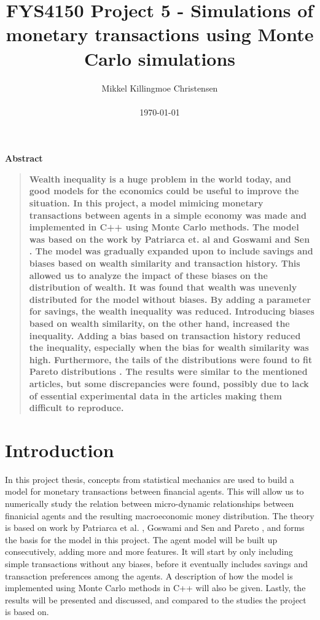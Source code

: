 \documentclass[11pt,a4paper,titlepage]{article}
\title{FYS4150 Project 5 - Simulations of monetary transactions using Monte Carlo simulations}
\author
{Mikkel Killingmoe Christensen\\
\\
\normalsize{\today}
}
\date{}
\newenvironment{sciabstract}{%
\begin{quote} \bf}
{\end{quote}}
\begin{document}
 


\maketitle 


\tableofcontents
\clearpage


\begin{center}
{\large \textbf{Abstract}}
\end{center}
\begin{sciabstract}
Wealth inequality is a huge problem in the world today, and good models  for the economics could be useful to improve the situation. In this project, a model mimicing monetary transactions between agents in a simple economy was made and implemented in C++ using Monte Carlo methods. The model was based on the work by Patriarca et. al \cite{Patriarca} and Goswami and Sen \cite{Goswami}. The model was gradually expanded upon to include savings and biases based on wealth similarity and transaction history. This allowed us to analyze the impact of these biases on the distribution of wealth. It was found that wealth was unevenly distributed for the model without biases. By adding a parameter for savings, the wealth inequality was reduced. Introducing biases based on wealth similarity, on the other hand, increased the inequality.  Adding a bias based on transaction history reduced the inequality, especially when the bias for wealth similarity was high. Furthermore, the tails of the distributions were found to fit Pareto distributions \cite{Pareto}. The results were similar to the mentioned articles, but some discrepancies were found, possibly due to lack of essential experimental data in the articles making them difficult to reproduce.  
\end{sciabstract}




\section{Introduction}
In this project thesis, concepts from statistical mechanics are used to build a model for monetary transactions between financial agents. This will allow us to numerically study the relation between micro-dynamic relationships between finanicial agents and the resulting macroeconomic money distribution. The theory is based on work by Patriarca et al. \cite{Patriarca}, Goswami and Sen \cite{Goswami} and Pareto \cite{Pareto}, and forms the basis for the model in this project. The agent model will be built up consecutively, adding more and more features. It will start by only including simple transactions without any biases, before it eventually includes savings and transaction preferences among the agents. A description of how the model is implemented using Monte Carlo methods in C++ will also be given. Lastly, the results will be presented and discussed, and compared to the studies the project is based on. 
\end{document}
